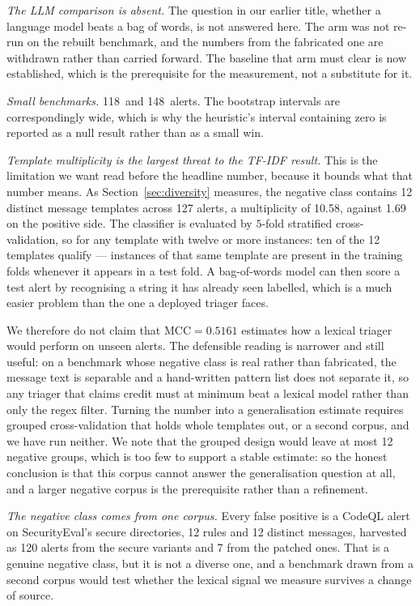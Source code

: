 \documentclass[journal]{IEEEtran}
\theoremstyle{definition}
\newcommand{\RNfp}{127}
\newcommand{\RNbal}{118}
\newcommand{\RNimb}{148}
\newcommand{\RNrulesFp}{12}
\newcommand{\RNmsgFp}{12}
\newcommand{\RTfidfBalMcc}{0.5161}
\newcommand{\CMsgFp}{12}
\newcommand{\CMultTp}{1.69}
\newcommand{\CMultFp}{10.58}
\newcommand{\CFpSecure}{120}
\newcommand{\CFpPatched}{7}
\begin{document}
\emph{The LLM comparison is absent.} The question in our earlier title, whether
a language model beats a bag of words, is not answered here. The arm was not
re-run on the rebuilt benchmark, and the numbers from the fabricated one are
withdrawn rather than carried forward. The baseline that arm must clear is now
established, which is the prerequisite for the measurement, not a substitute
for it.

\emph{Small benchmarks.} \RNbal\ and \RNimb\ alerts. The bootstrap intervals are
correspondingly wide, which is why the heuristic's interval containing zero is
reported as a null result rather than as a small win.

\emph{Template multiplicity is the largest threat to the TF-IDF result.}
This is the limitation we want read before the headline number, because it
bounds what that number means. As Section~\ref{sec:diversity} measures, the
negative class contains \CMsgFp{} distinct message templates across \RNfp{}
alerts, a multiplicity of \CMultFp{}, against \CMultTp{} on the positive side.
The classifier is evaluated by \(5\)-fold stratified cross-validation, so for
any template with twelve or more instances: ten of the \CMsgFp{} templates
qualify --- instances of that same template are present in the training folds
whenever it appears in a test fold. A bag-of-words model can then score a test
alert by recognising a string it has already seen labelled, which is a much
easier problem than the one a deployed triager faces.

We therefore do not claim that $\mathrm{MCC} = \RTfidfBalMcc$ estimates how a
lexical triager would perform on unseen alerts. The defensible reading is
narrower and still useful: on a benchmark whose negative class is real rather
than fabricated, the message text is separable and a hand-written pattern list
does not separate it, so any triager that claims credit must at minimum beat a
lexical model rather than only the regex filter. Turning the number into a
generalisation estimate requires grouped cross-validation that holds whole
templates out, or a second corpus, and we have run neither. We note that the
grouped design would leave at most \CMsgFp{} negative groups, which is too few
to support a stable estimate: so the honest conclusion is that this corpus
cannot answer the generalisation question at all, and a larger negative corpus
is the prerequisite rather than a refinement.

\emph{The negative class comes from one corpus.} Every false positive is a
CodeQL alert on SecurityEval's secure directories, \RNrulesFp{} rules and
\RNmsgFp{} distinct messages, harvested as \CFpSecure{} alerts from the secure
variants and \CFpPatched{} from the patched ones. That is a genuine negative
class, but it is not a diverse one, and a benchmark drawn from a second corpus
would test whether the lexical signal we measure survives a change of source.
\end{document}
